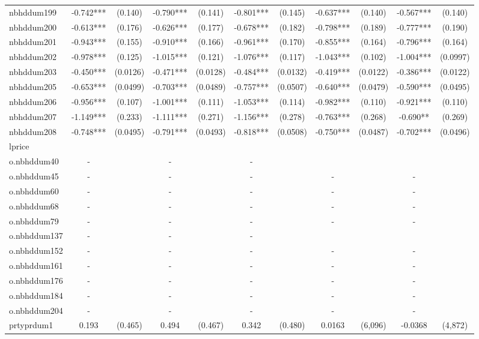 \documentclass[]{article}
\begin{document}
\begin{tabular}{lcccccccccc}
nbhddum199 & -0.742*** & (0.140) & -0.790*** & (0.141) & -0.801*** & (0.145) & -0.637*** & (0.140) & -0.567*** & (0.140) \\
nbhddum200 & -0.613*** & (0.176) & -0.626*** & (0.177) & -0.678*** & (0.182) & -0.798*** & (0.189) & -0.777*** & (0.190) \\
nbhddum201 & -0.943*** & (0.155) & -0.910*** & (0.166) & -0.961*** & (0.170) & -0.855*** & (0.164) & -0.796*** & (0.164) \\
nbhddum202 & -0.978*** & (0.125) & -1.015*** & (0.121) & -1.076*** & (0.117) & -1.043*** & (0.102) & -1.004*** & (0.0997) \\
nbhddum203 & -0.450*** & (0.0126) & -0.471*** & (0.0128) & -0.484*** & (0.0132) & -0.419*** & (0.0122) & -0.386*** & (0.0122) \\
nbhddum205 & -0.653*** & (0.0499) & -0.703*** & (0.0489) & -0.757*** & (0.0507) & -0.640*** & (0.0479) & -0.590*** & (0.0495) \\
nbhddum206 & -0.956*** & (0.107) & -1.001*** & (0.111) & -1.053*** & (0.114) & -0.982*** & (0.110) & -0.921*** & (0.110) \\
nbhddum207 & -1.149*** & (0.233) & -1.111*** & (0.271) & -1.156*** & (0.278) & -0.763*** & (0.268) & -0.690** & (0.269) \\
nbhddum208 & -0.748*** & (0.0495) & -0.791*** & (0.0493) & -0.818*** & (0.0508) & -0.750*** & (0.0487) & -0.702*** & (0.0496) \\
lprice &  &  &  &  &  &  &  &  &  &  \\
o.nbhddum40 & - &  & - &  & - &  &  &  &  &  \\
o.nbhddum45 & - &  & - &  & - &  & - &  & - &  \\
o.nbhddum60 & - &  & - &  & - &  & - &  & - &  \\
o.nbhddum68 & - &  & - &  & - &  & - &  & - &  \\
o.nbhddum79 & - &  & - &  & - &  & - &  & - &  \\
o.nbhddum137 & - &  & - &  & - &  &  &  &  &  \\
o.nbhddum152 & - &  & - &  & - &  & - &  & - &  \\
o.nbhddum161 & - &  & - &  & - &  & - &  & - &  \\
o.nbhddum176 & - &  & - &  & - &  & - &  & - &  \\
o.nbhddum184 & - &  & - &  & - &  & - &  & - &  \\
o.nbhddum204 & - &  & - &  & - &  & - &  & - &  \\
prtyprdum1 & 0.193 & (0.465) & 0.494 & (0.467) & 0.342 & (0.480) & 0.0163 & (6,096) & -0.0368 & (4,872) \\

\end{tabular}
\end{document}
